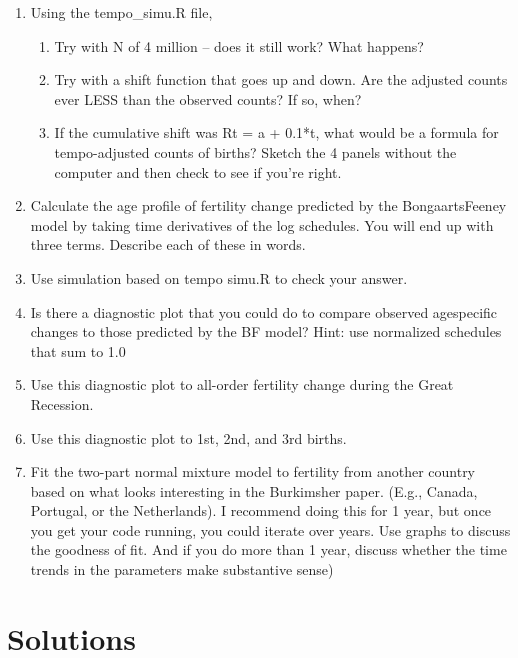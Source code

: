 \documentclass[]{book}
\providecommand{\tightlist}{%
  \setlength{\itemsep}{0pt}\setlength{\parskip}{0pt}}
\begin{document}
\begin{enumerate}
\def\labelenumi{\arabic{enumi}.}
\tightlist
\item
  Using the tempo\_simu.R file,

  \begin{enumerate}
  \def\labelenumii{\alph{enumii}.}
  \tightlist
  \item
    Try with N of 4 million -- does it still work? What happens?
  \item
    Try with a shift function that goes up and down. Are the adjusted counts ever LESS than the observed counts? If so, when?\\
  \item
    If the cumulative shift was Rt = a + 0.1*t, what would be a formula for tempo-adjusted counts of births? Sketch the 4 panels without the computer and then check to see if you're right.
  \end{enumerate}
\item
  Calculate the age profile of fertility change predicted by the BongaartsFeeney model by taking time derivatives of the log schedules. You will end up with three terms. Describe each of these in words.\\
\item
  Use simulation based on tempo simu.R to check your answer.\\
\item
  Is there a diagnostic plot that you could do to compare observed agespecific changes to those predicted by the BF model? Hint: use normalized schedules that sum to 1.0\\
\item
  Use this diagnostic plot to all-order fertility change during the Great Recession.\\
\item
  Use this diagnostic plot to 1st, 2nd, and 3rd births.\\
\item
  Fit the two-part normal mixture model to fertility from another country based on what looks interesting in the Burkimsher paper. (E.g., Canada, Portugal, or the Netherlands). I recommend doing this for 1 year, but once you get your code running, you could iterate over years. Use graphs to discuss the goodness of fit. And if you do more than 1 year, discuss whether the time trends in the parameters make substantive sense)
\end{enumerate}

\hypertarget{solutions-3}{%
\section{Solutions}\label{solutions-3}}
\end{document}
